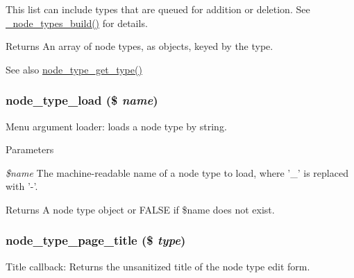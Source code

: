 This list can include types that are queued for addition or deletion. See \hyperlink{node_8module_a31b891b6c1ffba98fd4478e4255e301b}{\_\-node\_\-types\_\-build()} for details.

\begin{DoxyReturn}{Returns}
An array of node types, as objects, keyed by the type.
\end{DoxyReturn}
\begin{DoxySeeAlso}{See also}
\hyperlink{node_8module_a0989ce8c8f1d5abbf5db159c77e68fc4}{node\_\-type\_\-get\_\-type()} 
\end{DoxySeeAlso}
\hypertarget{node_8module_a96fe260f0247f9be132f0ce33016120d}{
\subsubsection[{node\_\-type\_\-load}]{\setlength{\rightskip}{0pt plus 5cm}node\_\-type\_\-load (\$ {\em name})}}
\label{node_8module_a96fe260f0247f9be132f0ce33016120d}
Menu argument loader: loads a node type by string.


\begin{DoxyParams}{Parameters}
\item[{\em \$name}]The machine-\/readable name of a node type to load, where '\_\-' is replaced with '-\/'.\end{DoxyParams}
\begin{DoxyReturn}{Returns}
A node type object or FALSE if \$name does not exist. 
\end{DoxyReturn}
\hypertarget{node_8module_a30a46060119997578241d929b2de9e4f}{
\subsubsection[{node\_\-type\_\-page\_\-title}]{\setlength{\rightskip}{0pt plus 5cm}node\_\-type\_\-page\_\-title (\$ {\em type})}}
\label{node_8module_a30a46060119997578241d929b2de9e4f}
Title callback: Returns the unsanitized title of the node type edit form.


